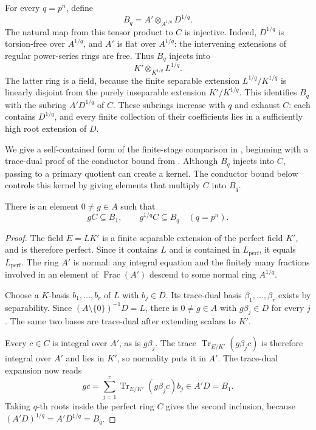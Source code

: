 For every $q=p^n$, define
\[
 B_q=A'\otimes_{A^{1/q}}D^{1/q}.
\]
The natural map from this tensor product to $C$ is injective.  Indeed,
$D^{1/q}$ is torsion-free over $A^{1/q}$, and $A'$ is flat over
$A^{1/q}$: the intervening extensions of regular power-series rings
are free.  Thus $B_q$ injects into
\[
 K'\otimes_{K^{1/q}}L^{1/q}.
\]
The latter ring is a field, because the finite separable extension
$L^{1/q}/K^{1/q}$ is linearly disjoint from the purely inseparable
extension $K'/K^{1/q}$.  This identifies $B_q$ with the subring
$A'D^{1/q}$ of $C$.  These subrings increase with $q$ and exhaust $C$:
each contains $D^{1/q}$, and every finite collection of their
coefficients lies in a sufficiently high root extension of $D$.

We give a self-contained form of the finite-stage comparison in
\cite[Section~3 and Theorem~3.0.7]{CLMST}, beginning with a trace-dual
proof of the conductor bound from \cite[Lemma~2.3]{PolstraTucker}.
Although $B_q$ injects into $C$, passing to a primary quotient can
create a kernel.  The conductor bound below controls this kernel by
giving elements that multiply $C$ into $B_q$.

\begin{lemma}\label{lem:perfection-conductor}
There is an element $0\neq g\in A$ such that
\[
 gC\subseteq B_1,
 \qquad g^{1/q}C\subseteq B_q\quad(q=p^n).
\]
\end{lemma}

\begin{proof}
The field $E=LK'$ is a finite separable extension of the perfect field
$K'$, and is therefore perfect.  Since it contains $L$ and is contained
in $L_{\mathrm{perf}}$, it equals $L_{\mathrm{perf}}$.
The ring $A'$ is normal: any integral equation and the finitely many
fractions involved in an element of $\operatorname{Frac}(A')$ descend
to some normal ring $A^{1/q}$.

Choose a $K$-basis $b_1,\ldots,b_r$ of $L$ with $b_j\in D$.
Its trace-dual basis $\beta_1,\ldots,\beta_r$ exists by separability.
Since $(A\setminus\{0\})^{-1}D=L$, there is $0\neq g\in A$ with
$g\beta_j\in D$ for every $j$.  The same two bases are trace-dual
after extending scalars to $K'$.

Every $c\in C$ is integral over $A'$, as is $g\beta_j$.
The trace $\operatorname{Tr}_{E/K'}(g\beta_jc)$ is therefore integral
over $A'$ and lies in $K'$, so normality puts it in $A'$.
The trace-dual expansion now reads
\[
 gc=\sum_{j=1}^r
       \operatorname{Tr}_{E/K'}(g\beta_jc)b_j\in A'D=B_1.
\]
Taking $q$-th roots inside the perfect ring $C$ gives the second
inclusion, because $(A'D)^{1/q}=A'D^{1/q}=B_q$.
\end{proof}

